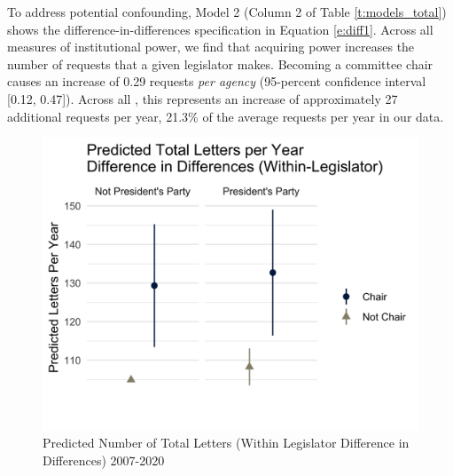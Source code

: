 \documentclass[12pt]{article}
\begin{document}
To address potential confounding, Model 2 (Column 2 of Table \ref{t:models_total}) shows the difference-in-differences specification in Equation \ref{e:diff1}. Across all measures of institutional power, we find that acquiring power increases the number of requests that a given legislator makes. Becoming a committee chair causes an increase of  0.29 requests \textit{per agency} (95-percent confidence interval [0.12, 0.47]). Across all , this represents an increase of approximately 27 additional requests per year, 21.3\% of the average requests per year in our data. %




\begin{figure}[hbt!]
\centering
\caption{Predicted Number of Total Letters (Within Legislator Difference in Differences) 2007-2020} \label{f:m-total-predicted}
\includegraphics[width = .8\textwidth]{figs/m-total-predicted-3}
\end{figure}
\end{document}

